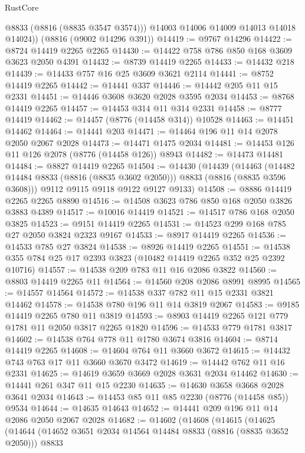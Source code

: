 \begin{lexlean}{RustCore}
\begin{coremodule}
          @8833
          (@8816 (@8835 @3547 @3574)))
        @14003
        @14006
        @14009
        @14013
        @14018
        @14024))
    (@8816 (@9002 @14296 @391))
@14419 := @9767 @14296
@14422 := @8724 @14419 @2265 @2265
@14430 := @14422 @758 @786 @850 @168 @3609 @3623 @2050 @4391
@14432 := @8739 @14419 @2265
@14433 := @14432 @218
@14439 := @14433 @757 @16 @25 @3609 @3621 @2114
@14441 := @8752 @14419 @2265
@14442 := @14441 @337
@14446 := @14442 @205 @11 @15 @2331
@14451 := @14446 @3608 @3620 @2028 @3595 @2034
@14453 := @8768 @14419 @2265
@14457 := @14453 @314 @11 @314 @2331
@14458 := @8777 @14419
@14462 := @14457 (@8776 (@14458 @314)) @10528
@14463 := @14451 @14462
@14464 := @14441 @203
@14471 := @14464 @196 @11 @14 @2078 @2050 @2067 @2028
@14473 := @14471 @1475 @2034
@14481 := @14453 @126 @11 @126 @2078 (@8776 (@14458 @126)) @8943
@14482 := @14473 @14481
@14484 := @8827 @14419 @2265
@14504 := @14430
    (@14439
      (@14463 (@14482 @14484 @8833 (@8816 (@8835 @3602 @2050))) @8833 (@8816 (@8835 @3596 @3608)))
      @9112
      @9115
      @9118
      @9122
      @9127
      @9133)
@14508 := @8886 @14419 @2265 @2265 @8890
@14516 := @14508 @3623 @786 @850 @168 @2050 @3826 @3883 @4389
@14517 := @10016 @14419
@14521 := @14517 @786 @168 @2050 @3825
@14523 := @9151 @14419 @2265
@14531 := @14523 @299 @168 @785 @27 @2050 @3824 @2323 @9167
@14533 := @8917 @14419 @2265
@14536 := @14533 @785 @27 @3824
@14538 := @8926 @14419 @2265
@14551 := @14538 @355 @784 @25 @17 @2393 @3823 (@10482 @14419 @2265 @352 @25 @2392 @10716)
@14557 := @14538 @209 @783 @11 @16 @2086 @3822
@14560 := @8803 @14419 @2265 @11
@14564 := @14560 @208 @2086 @8991 @8995
@14565 := @14557 @14564
@14572 := @14538 @337 @782 @11 @15 @2331 @3821 @14462
@14578 := @14538 @780 @196 @11 @14 @3819 @2067
@14583 := @9185 @14419 @2265 @780 @11 @3819
@14593 := @8903 @14419 @2265 @121 @779 @1781 @11 @2050 @3817 @2265 @1820
@14596 := @14533 @779 @1781 @3817
@14602 := @14538 @764 @778 @11 @1780 @3674 @3816
@14604 := @8714 @14419 @2265
@14608 := @14604 @764 @11 @3660 @3672
@14615 := @14432 @743 @763 @17 @11 @3660 @3670 @3472
@14619 := @14442 @762 @11 @16 @2331
@14625 := @14619 @3659 @3669 @2028 @3631 @2034 @14462
@14630 := @14441 @261 @347 @11 @15 @2230
@14635 := @14630 @3658 @3668 @2028 @3641 @2034
@14643 := @14453 @85 @11 @85 @2230 (@8776 (@14458 @85)) @9534
@14644 := @14635 @14643
@14652 := @14441 @209 @196 @11 @14 @2086 @2050 @2067 @2028
@14682 := @14602
    (@14608
      (@14615
        (@14625
          (@14644
            (@14652 @3651 @2034 @14564 @14484 @8833 (@8816 (@8835 @3652 @2050)))
            @8833

\end{coremodule}
\end{lexlean}
